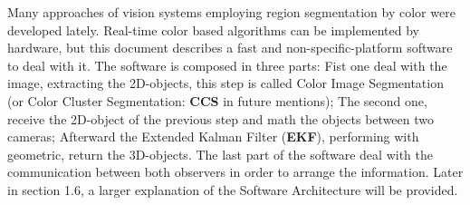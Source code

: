 Many approaches of vision systems employing region segmentation by color were developed lately. Real-time color based algorithms can be implemented by hardware, but this document describes a fast and non-specific-platform software to deal with it. The software is composed in three parts: Fist one deal with the image, extracting the 2D-objects, this step is called Color Image Segmentation \cite{JamesBruce} (or Color Cluster Segmentation: \textbf{CCS} in future mentions); The second one, receive the 2D-object of the previous step and math the objects between two cameras; Afterward the Extended Kalman Filter (\textbf{EKF}), performing with geometric, return the 3D-objects. The last part of the software deal with the communication between both observers in order to arrange the information. Later in section 1.6, a larger explanation of the Software Architecture will be provided.
